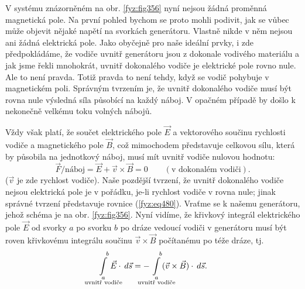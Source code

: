 {  V systému znázorněném na obr. \ref{fyz:fig356} nyní nejsou žádná proměnná magnetická pole. Na 
  první pohled bychom se proto mohli podivit, jak se vůbec může objevit nějaké napětí na svorkách 
  generátoru. Vlastně nikde v něm nejsou ani žádná elektrická pole. Jako obyčejně pro naše ideální 
  prvky, i zde předpokládáme, že vodiče uvnitř generátoru jsou z dokonale vodivého materiálu a jak 
  jsme řekli mnohokrát, uvnitř dokonalého vodiče je elektrické pole rovno nule. Ale to není pravda. 
  Totiž pravda to není tehdy, když se vodič pohybuje v magnetickém poli. Správným tvrzením je, že 
  uvnitř dokonalého vodiče musí být rovna nule výsledná síla působící na každý náboj. V opačném 
  případě by došlo k nekonečně velkému toku volných nábojů.
  
  Vždy však platí, že součet elektrického pole \(\vec{E}\) a vektorového součinu rychlosti vodiče a 
  magnetického pole \(\vec{B}\), což mimochodem představuje celkovou sílu, která by působila na 
  jednotkový náboj, musí mít uvnitř vodiče nulovou hodnotu:
  \begin{equation}\label{fyz:eq480}
   \vec{F}/\text{náboj} = \vec{E} + \vec{v}\times\vec{B} = 0\qquad(\text{v dokonalém vodiči}).
  \end{equation}
  (\(\vec{v}\) je zde rychlost vodiče). Naše pozdější tvrzení, že uvnitř dokonalého vodiče nejsou 
  elektrická pole je v pořádku, je-li rychlost vodiče v rovna nule; jinak správné tvrzení 
  představuje rovnice (\ref{fyz:eq480}). Vraťme se k našemu generátoru, jehož schéma je na obr. 
  \ref{fyz:fig356}. Nyní vidíme, že křivkový integrál elektrického pole \(\vec{E}\) od svorky \(a\) 
  po svorku \(b\) po dráze vedoucí vodiči v generátoru musí být roven křivkovému integrálu součinu 
  \(\vec{v}\times\vec{B}\) počítanému po téže dráze, tj.
  \begin{equation}\label{fyz:eq481}
       \limitint_{\mathclap{\substack{a\\\text{uvnitř vodiče}}}}^{\quad b}\vec{E}\cdot\dd{\vec{s}} =
     - \limitint_{\mathclap{\substack{a\\\text{uvnitř vodiče}}}}^{\quad b} 
                                   (\vec{v}\times\vec{B})\cdot\dd{\vec{s}}.
  \end{equation}

}
